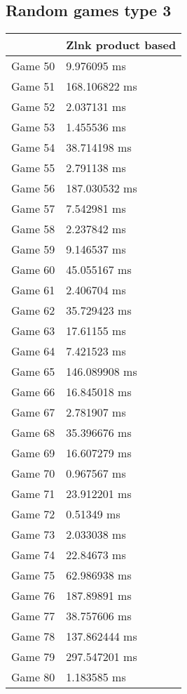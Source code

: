 \subsection{Random games type 3}
\begin{tabular}{|l|l|}
	\hline
	& Zlnk product based \\ \hline
	Game 50 & 9.976095 ms \\ \hline
	Game 51 & 168.106822 ms \\ \hline
	Game 52 & 2.037131 ms \\ \hline
	Game 53 & 1.455536 ms \\ \hline
	Game 54 & 38.714198 ms \\ \hline
	Game 55 & 2.791138 ms \\ \hline
	Game 56 & 187.030532 ms \\ \hline
	Game 57 & 7.542981 ms \\ \hline
	Game 58 & 2.237842 ms \\ \hline
	Game 59 & 9.146537 ms \\ \hline
	Game 60 & 45.055167 ms \\ \hline
	Game 61 & 2.406704 ms \\ \hline
	Game 62 & 35.729423 ms \\ \hline
	Game 63 & 17.61155 ms \\ \hline
	Game 64 & 7.421523 ms \\ \hline
	Game 65 & 146.089908 ms \\ \hline
	Game 66 & 16.845018 ms \\ \hline
	Game 67 & 2.781907 ms \\ \hline
	Game 68 & 35.396676 ms \\ \hline
	Game 69 & 16.607279 ms \\ \hline
	Game 70 & 0.967567 ms \\ \hline
	Game 71 & 23.912201 ms \\ \hline
	Game 72 & 0.51349 ms \\ \hline
	Game 73 & 2.033038 ms \\ \hline
	Game 74 & 22.84673 ms \\ \hline
	Game 75 & 62.986938 ms \\ \hline
	Game 76 & 187.89891 ms \\ \hline
	Game 77 & 38.757606 ms \\ \hline
	Game 78 & 137.862444 ms \\ \hline
	Game 79 & 297.547201 ms \\ \hline
	Game 80 & 1.183585 ms \\ \hline

\end{tabular}

